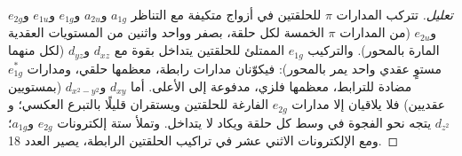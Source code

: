 \begin{proof}[تعليل]
تتركب المدارات $\pi$ للحلقتين في أزواج متكيفة مع التناظر $a_{1g}$ و$a_{2u}$ 
و$e_{1g}$ و$e_{1u}$ و$e_{2g}$ و$e_{2u}$ (من المدارات $\pi$ الخمسة لكل حلقة، بصفر وواحد واثنين
من المستويات العقدية المارة بالمحور). والتركيب $e_{1g}$ الممتلئ للحلقتين يتداخل
بقوة مع $d_{xz}$ و$d_{yz}$ (لكل منهما مستوٍ عقدي واحد يمر بالمحور): فيكوّنان مدارات رابطة،
معظمها حلقي، ومدارات $e_{1g}^\ast$ مضادة للترابط، معظمها فلزي، مدفوعة إلى الأعلى. أما $d_{xy}$ و$d_{x^2-y^2}$
(بمستويين عقديين) فلا يلاقيان إلا مدارات $e_{2g}$ الفارغة للحلقتين ويستقران قليلًا
بالتبرع العكسي؛ و$d_{z^2}$ يتجه نحو الفجوة في وسط كل حلقة 
ويكاد لا يتداخل. وتملأ ستة إلكترونات $e_{2g}$ و$a_{1g}$؛ ومع الإلكترونات الاثني عشر في
تراكيب الحلقتين الرابطة، يصير العدد 18.
\end{proof}

